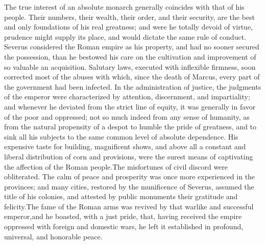 
The true interest of an absolute monarch generally coincides with
that of his people. Their numbers, their wealth, their order, and
their security, are the best and only foundations of his real
greatness; and were he totally devoid of virtue, prudence might
supply its place, and would dictate the same rule of conduct.
Severus considered the Roman empire as his property, and had no
sooner secured the possession, than he bestowed his care on the
cultivation and improvement of so valuable an acquisition.
Salutary laws, executed with inflexible firmness, soon corrected
most of the abuses with which, since the death of Marcus, every
part of the government had been infected. In the administration
of justice, the judgments of the emperor were characterized by
attention, discernment, and impartiality; and whenever he
deviated from the strict line of equity, it was generally in
favor of the poor and oppressed; not so much indeed from any
sense of humanity, as from the natural propensity of a despot to
humble the pride of greatness, and to sink all his subjects to
the same common level of absolute dependence. His expensive taste
for building, magnificent shows, and above all a constant and
liberal distribution of corn and provisions, were the surest
means of captivating the affection of the Roman people.\footnotemark[59] The
misfortunes of civil discord were obliterated. The calm of peace
and prosperity was once more experienced in the provinces; and
many cities, restored by the munificence of Severus, assumed the
title of his colonies, and attested by public monuments their
gratitude and felicity.\footnotemark[60] The fame of the Roman arms was revived
by that warlike and successful emperor,\footnotemark[61] and he boasted, with a
just pride, that, having received the empire oppressed with
foreign and domestic wars, he left it established in profound,
universal, and honorable peace.\footnotemark[62]



